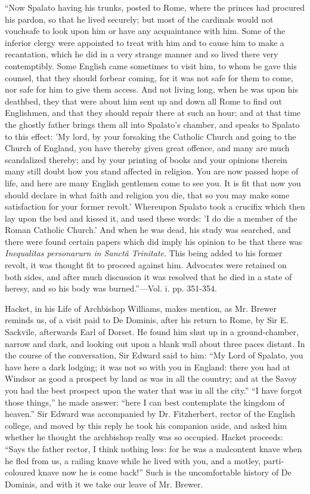 ``Now Spalato having his trunks,
posted to Rome, where the princes had procured his pardon, so that he
lived securely; but most of the cardinals would not vouchsafe to look
upon him or have any acquaintance with him.
Some of the inferior clergy were appointed to treat with him and to
cause him to make a recantation, which he did in a very strange manner
and so lived there very contemptibly. Some English came sometimes to
visit him, to whom be gave this counsel, that they should forbear
coming, for it was not safe for them to come, nor safe for him to give
them access. And not living long, when he was upon his deathbed, they
that were about him sent up and down all Rome to find out Englishmen,
and that they should repair there at such an hour; and at that time the
ghostly father brings them all into Spalato's chamber, and speaks to
Spalato to this effect: 'My lord, by your forsaking the Catholic Church
and going to the Church of England, you have thereby given great
offence, and many are much scandalized thereby; and by your printing of
books and your opinions therein many still doubt how you stand affected
in religion. You are now passed hope of life, and here are many English
gentlemen come to see you. It is fit that now you should declare in what
faith and religion you die, that so you may make some satisfaction for
your former revolt.' Whereupon Spalato took a crucifix which then lay
upon the bed and kissed it, and used these words: 'I do die a member of
the Roman Catholic Church.' And when he was dead, his study was
searched, and there were found certain papers which did imply his
opinion to be that there was \emph{Inequalitas personarurn in Sanctâ
Trinitate}. This being added to his former revolt, it was thought fit
to proceed against him. Advocates were retained on both sides, and after
much discussion it was resolved that he died in a state of heresy, and
so his body was burned.''—Vol. i. pp. 351-354.

Hacket, in his Life of Archbishop Williams, makes
mention, as Mr. Brewer reminds us, of a visit paid to De Dominis, after
his return to Rome, by Sir E. Sackvile, afterwards Earl of Dorset. He
found him shut up in a ground-chamber, narrow and dark, and looking out
upon a blank wall about three paces distant. In the course of the
conversation, Sir Edward said to him: ``My Lord of Spalato, you have here
a dark lodging; it was not so with you in England: there you had at
Windsor as good a prospect by land as was in all the country; and at the
Savoy you had the best prospect upon the water that was in all the city.''
``I have forgot those things,'' he made answer: ``here I can best
contemplate the kingdom of heaven.'' Sir Edward was accompanied by Dr.
Fitzherbert, rector of the English college, and moved by this reply he
took his companion aside, and asked him whether he thought the
archbishop really was so occupied. Hacket proceeds: ``Says the father
rector, I think nothing less: for he was a malcontent knave when he fled
from us, a railing knave while he lived with you, and a motley,
parti-coloured knave now he is come back!'' Such is the uncomfortable
history of De Dominis, and with it we take our leave of Mr. Brewer.

